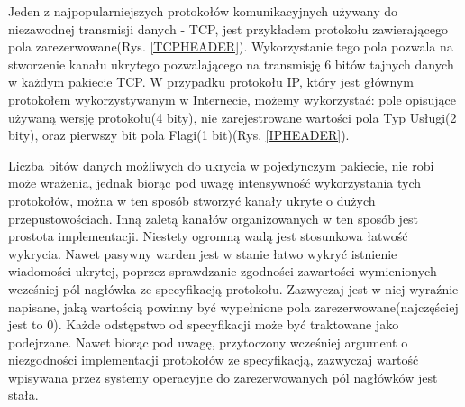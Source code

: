 \documentclass[a4paper, twoside, 12pt]{report}
\begin{document}
        Jeden z najpopularniejszych protokołów komunikacyjnych używany do niezawodnej
        transmisji danych - TCP, jest przykładem protokołu zawierającego pola zarezerwowane(Rys. \ref{TCPHEADER}).
        Wykorzystanie tego pola pozwala na stworzenie kanału ukrytego pozwalającego
        na transmisję 6 bitów tajnych danych w każdym pakiecie TCP. W przypadku protokołu
        IP, który jest głównym protokołem wykorzystywanym w Internecie, możemy wykorzystać: pole
        opisujące używaną wersję protokołu(4 bity), nie zarejestrowane wartości pola Typ Usługi(2 bity),
        oraz pierwszy bit pola Flagi(1 bit)(Rys. \ref{IPHEADER})\cite{IPRFC}.

        Liczba bitów danych
        możliwych do ukrycia w pojedynczym pakiecie, nie robi może wrażenia, jednak biorąc
        pod uwagę intensywność wykorzystania tych protokołów, można w ten sposób
        stworzyć kanały ukryte o dużych przepustowościach. Inną zaletą kanałów organizowanych
        w ten sposób jest prostota implementacji. Niestety ogromną wadą jest stosunkowa
        łatwość wykrycia. Nawet pasywny warden jest w stanie łatwo wykryć istnienie wiadomości
        ukrytej, poprzez sprawdzanie zgodności zawartości wymienionych wcześniej pól
        nagłówka ze specyfikacją protokołu. Zazwyczaj jest w niej wyraźnie napisane,
        jaką wartością powinny być wypełnione pola zarezerwowane(najczęściej jest to 0).
        Każde odstępstwo od specyfikacji może być traktowane jako podejrzane. Nawet biorąc
        pod uwagę, przytoczony wcześniej argument o niezgodności implementacji protokołów
        ze specyfikacją, zazwyczaj wartość wpisywana przez systemy operacyjne do
        zarezerwowanych pól nagłówków jest stała.
\end{document}
